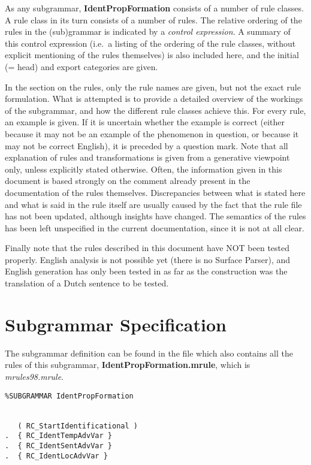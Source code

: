 As any subgrammar, {\bf IdentPropFormation} consists of 
a number of rule classes. A rule class in its turn
consists of a number of rules. The relative ordering of the rules in the
(sub)grammar is indicated by a {\em control expression}. A summary of this
control expression (i.e.\ a listing of the ordering of the rule classes, 
without explicit mentioning of the rules themselves) is also included here, 
and the initial (= head) and export categories are given. 

In the section on the rules, only the rule names are given, 
but not the exact rule formulation. What is attempted 
is to provide a detailed overview of the workings of the subgrammar, and 
how the different rule classes achieve this. For every rule, an 
example is given. If it is uncertain whether the example is correct (either 
because it may not be an example of the phenomenon in question, or because it 
may not be correct English), it is preceded by a question mark. Note that all 
explanation of rules and transformations is given from a generative viewpoint
only, unless explicitly stated otherwise. Often, the information given in this 
document is based strongly on the comment already present in the documentation 
of the rules themselves. Discrepancies between what is stated here and what is 
said in the rule itself are usually caused by the fact that the rule file has 
not  been updated, although insights have changed. The semantics of the rules 
has been left unspecified in the current documentation, since it is not at all 
clear.

Finally note that the rules described in this document have NOT been tested 
properly. English analysis is not possible yet (there is no Surface Parser), and 
English generation has only been tested in as far as the construction was the 
translation of a Dutch sentence to be tested.

\newpage
\section{Subgrammar Specification}
The subgrammar definition can be found in the file which also contains all the 
rules of this subgrammar, {\bf IdentPropFormation.mrule}, which is 
{\em mrules98.mrule\/}.

\begin{verbatim}
%SUBGRAMMAR IdentPropFormation


   ( RC_StartIdentificational )
.  { RC_IdentTempAdvVar }
.  { RC_IdentSentAdvVar }
.  { RC_IdentLocAdvVar }

\end{verbatim}


